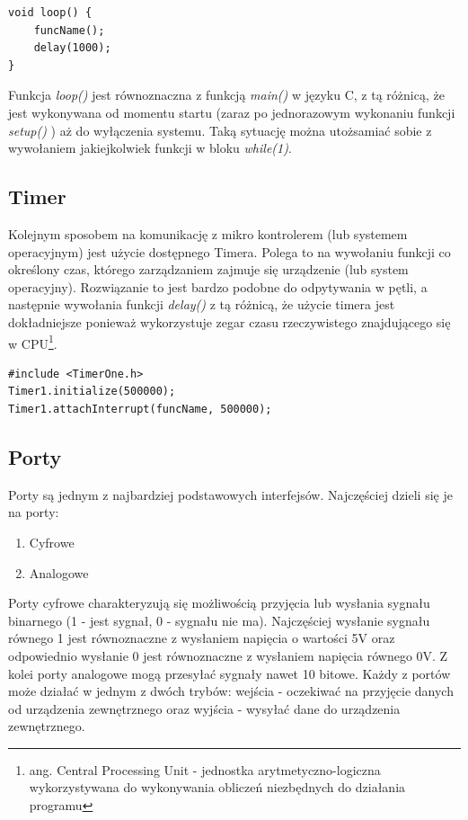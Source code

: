 \documentclass{xmgr}
\begin{document}
\begin{lstlisting}[label=bot-dirs-alg,caption=Odpytywanie w nieskończonej pętli w środowisku Arduino]
void loop() {
	funcName();
	delay(1000);
}
\end{lstlisting}

Funkcja \emph{loop()} jest równoznaczna z funkcją \emph{main()} w języku C, z tą różnicą, że jest wykonywana od momentu startu (zaraz po jednorazowym wykonaniu funkcji \emph{setup()} ) aż do wyłączenia systemu. Taką sytuację można utożsamiać sobie z wywołaniem jakiejkolwiek funkcji w bloku \emph{while(1)}.

\subsection{Timer}
Kolejnym sposobem na komunikację z mikro kontrolerem (lub systemem operacyjnym) jest użycie dostępnego Timera. Polega to na wywołaniu funkcji co określony czas, którego zarządzaniem zajmuje się urządzenie (lub system operacyjny). Rozwiązanie to jest bardzo podobne do odpytywania w pętli, a następnie wywołania funkcji \emph{delay()} z tą różnicą, że użycie timera jest dokładniejsze ponieważ wykorzystuje zegar czasu rzeczywistego znajdującego się w CPU\footnote{ang. Central Processing Unit - jednostka arytmetyczno-logiczna wykorzystywana do wykonywania obliczeń niezbędnych do działania programu}.
\begin{lstlisting}[label=bot-dirs-alg,caption=Przykładowe użycie timer w środowisku Arduino]
#include <TimerOne.h>
Timer1.initialize(500000);
Timer1.attachInterrupt(funcName, 500000);
\end{lstlisting}

\subsection{Porty}
Porty są jednym z najbardziej podstawowych interfejsów. Najczęściej dzieli się je na porty:
\begin{enumerate}
	\item Cyfrowe
	\item Analogowe
\end{enumerate}

Porty cyfrowe charakteryzują się możliwością przyjęcia lub wysłania sygnału binarnego (1 - jest sygnał, 0 - sygnału nie ma). Najczęściej wysłanie sygnału równego 1 jest równoznaczne z wysłaniem napięcia o wartości 5V oraz odpowiednio wysłanie 0 jest równoznaczne z wysłaniem napięcia równego 0V. Z kolei porty analogowe mogą przesyłać sygnały nawet 10 bitowe. Każdy z portów może działać w jednym  z dwóch trybów: wejścia - oczekiwać na przyjęcie danych od urządzenia zewnętrznego oraz wyjścia - wysyłać dane do urządzenia zewnętrznego.
\end{document}

